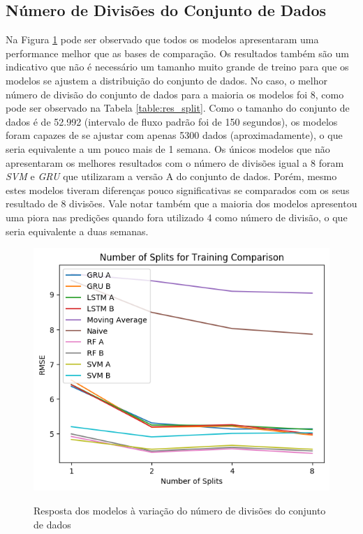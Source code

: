 \subsection{Número de Divisões do Conjunto de Dados}

Na Figura \ref{figure:res_split} pode ser observado que todos os modelos apresentaram uma performance melhor que as bases de comparação. Os resultados também são um indicativo que não é necessário um tamanho muito grande de treino para que os modelos se ajustem a distribuição do conjunto de dados. No caso, o melhor número de divisão do conjunto de dados para a maioria os modelos foi  8, como pode ser observado na Tabela \ref{table:res_split}. Como o tamanho do conjunto de dados é de 52.992 (intervalo de fluxo padrão foi de 150 segundos), os modelos foram capazes de se ajustar com apenas 5300 dados (aproximadamente), o que seria equivalente a um pouco mais de 1 semana. Os únicos modelos que não apresentaram os melhores resultados com o número de divisões igual a 8 foram \textit{\acrshort{SVM}} e \textit{\acrshort{GRU}} que utilizaram a versão A do conjunto de dados. Porém, mesmo estes modelos tiveram diferenças pouco significativas se comparados com os seus resultado de 8 divisões. Vale notar também que a maioria dos modelos apresentou uma piora nas predições quando fora utilizado 4 como número de divisão, o que seria equivalente a duas semanas.

\begin{figure}[htbp]
    \centering
    \includegraphics[scale=0.8]{monography/img/number_of_splits_for_training_comparison_rmse.png}
    \label{figure:res_split}
    \caption[Resposta dos modelos à variação do número de divisões do conjunto de dados]{Resposta dos modelos à variação do número de divisões do conjunto de dados}
\end{figure} 

